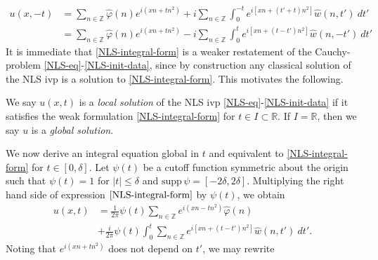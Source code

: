 \documentclass[handout]{beamer}
\numberwithin{equation}{section}
\newcommand{\rr}{\mathbb{R}}
\newcommand{\zz}{\mathbb{Z}}
\newcommand{\wh}{\widehat}
\newcommand{\vp}{\varphi}
\begin{document}
\begin{frame}

\begin{equation*}
	\begin{split}
		u(x,-t) & = \sum_{n \in \zz} \wh{\vp}(n) e^{i\left( xn + t n^{2} 
		\right)} 
		+ i \sum_{n \in \zz} \int_0^{-t} e^{i\left[ xn + \left( t' + t 
		\right)n^{2} \right]} \wh{w}(n, t') \ dt'
		\\
		& = \sum_{n \in \zz} \wh{\vp}(n) e^{i\left( xn + t n^{2} 
		\right)} 
		- i \sum_{n \in \zz} \int_0^t e^{i\left[ xn + \left( t - t' 
		\right)n^{2} \right]} \wh{w}(n, -t') \ dt'
	\end{split}
\end{equation*}
It is immediate that \eqref{NLS-integral-form} is a weaker 
restatement of the Cauchy-problem \eqref{NLS-eq}-\eqref{NLS-init-data}, 
since by construction any classical solution of the NLS 
ivp is a solution to \eqref{NLS-integral-form}. This motivates the 
following.
%
%
\end{frame}


\begin{frame}

\begin{definition}
	We say $u(x,t)$ is a \emph{local solution} of the NLS ivp
\eqref{NLS-eq}-\eqref{NLS-init-data} if it satisfies the weak formulation 
\eqref{NLS-integral-form} for $t \in I \subset \rr$. If $I = \rr$, then we say 
$u$ is a \emph{global solution}. 
%
%
\end{definition}
%
%
%
\end{frame}

\begin{frame}

We now derive an integral 
equation global in $t$ and equivalent to \eqref{NLS-integral-form} for $t 
\in [0, \delta]$. Let $\psi(t)$ be a cutoff function symmetric about the 
origin such that $\psi(t) = 1$ for $|t| \le \delta$ and $\text{supp} \, \psi 
= [-2\delta, 2\delta ]$. Multiplying the right hand side of expression
$\eqref{NLS-integral-form}$ by $\psi(t)$, we obtain
%
%
\begin{equation}
	\begin{split}
		\label{cutoff-int-eq}
		u(x, t)
		& = \frac{1}{2 \pi} \psi(t) \sum_{n \in \zz} e^{i(xn - tn^{2
		})} \widehat{\vp}(n) 
		\\
		& + \frac{i }{2 \pi} \psi(t) \int_0^t \sum_{n \in \zz} 
		e^{i\left[ xn + (t - t')n^{2} \right]} \wh{w}(n, t') \ dt'.
	\end{split}
\end{equation}
%
%
Noting that $e^{i\left( xn + tn^{2 } \right)}$ 
does not depend on $t'$, we may rewrite

\end{frame}
\end{document}
